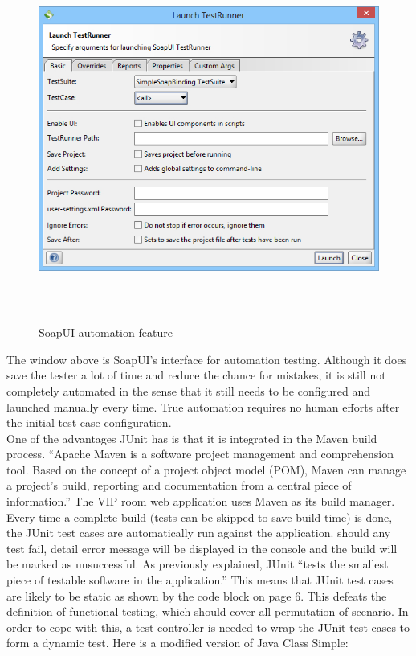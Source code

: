 \documentclass[12pt]{article}
\begin{document}
\begin{figure}[ht!]
\centering
\includegraphics[width=12cm,height=12cm,keepaspectratio]{img/soapAuto.jpg}
\caption{SoapUI automation feature}
\label{overflow}
\end{figure}

The window above is SoapUI's interface for automation testing. Although it does save the tester a lot of time and reduce the chance for mistakes, it is still not completely automated in the sense that it still needs to be configured and launched manually every time. True automation requires no human efforts after the initial test case configuration.\\

One of the advantages JUnit has is that it is integrated in the Maven build process. “Apache Maven is a software project management and comprehension tool. Based on the concept of a project object model (POM), Maven can manage a project's build, reporting and documentation from a central piece of information.”\cite{maven} The VIP room web application uses Maven as its build manager. Every time a complete build (tests can be skipped to save build time) is done, the JUnit test cases are automatically run against the application. should any test fail, detail error message will be displayed in the console and the build will be marked as unsuccessful. As previously explained, JUnit “tests the smallest piece of testable software in the application.”\cite{unit} This means that JUnit test cases are likely to be static as shown by the code block on page 6. This defeats the definition of functional testing, which should cover all permutation of scenario. In order to cope with this, a test controller is needed to wrap the JUnit test cases to form a dynamic test. Here is a modified version of Java Class Simple:
\end{document}
